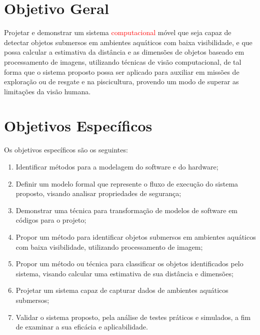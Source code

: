 

\section{Objetivo Geral}
Projetar e demonstrar um sistema \textcolor{red}{computacional} móvel que seja capaz de detectar objetos submersos em ambientes aquáticos com baixa visibilidade, e que possa calcular a estimativa da distância e as dimensões de objetos baseado em processamento de imagens, utilizando técnicas de visão computacional, de tal forma que o sistema proposto possa ser aplicado para auxiliar em missões de exploração ou de resgate e na piscicultura, provendo um modo de superar as limitações da visão humana.

\section{Objetivos Específicos}
Os objetivos específicos são os seguintes:
	\begin{enumerate}
		\item Identificar métodos para a modelagem do software e do hardware;

		\item Definir um modelo formal que represente o fluxo de execução do sistema proposto, visando analisar propriedades de segurança;

		\item Demonstrar uma técnica para transformação de modelos de software em códigos para o projeto;

		\item Propor um método para identificar objetos submersos em ambientes aquáticos com baixa visibilidade, utilizando processamento de imagem;

		\item Propor um método ou técnica para classificar os objetos identificados pelo sistema, visando calcular uma estimativa de sua distância e dimensões;

		\item Projetar um sistema capaz de capturar dados de ambientes aquáticos submersos;

		\item Validar o sistema proposto, pela análise de testes práticos e simulados, a fim de examinar a sua eficácia e aplicabilidade.

	\end{enumerate}
    
